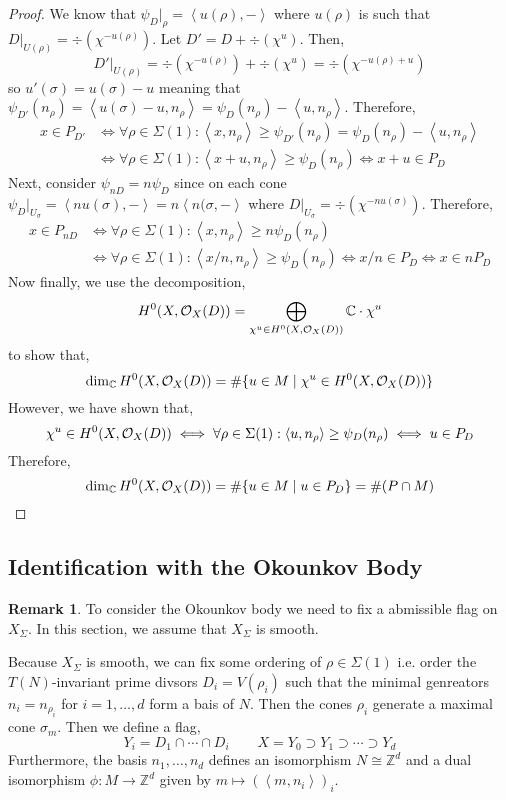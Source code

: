 \documentclass[12pt]{extarticle}
\newcommand{\Z}{\mathbb{Z}}
\newcommand{\C}{\mathbb{C}}
\theoremstyle{definition}
\newtheorem{remark}{Remark}
\newenvironment{definition}[1][Definition:]{\begin{trivlist}
\item[\hskip \labelsep {\bfseries #1}]}{\end{trivlist}}
\newcommand{\inner}[2]{\left< #1, #2 \right>}
\begin{document}
\begin{proof}
We know that $\psi_D |_\rho = \inner{u(\rho)}{-}$ where $u(\rho)$ is such that $D |_{U(\rho)} = \div{(\chi^{-u(\rho)})}$. Let $D' = D + \div{(\chi^u)}$. Then,
\[ D' |_{U(\rho)} = \div{(\chi^{-u(\rho)})} + \div{(\chi^u)} = \div{(\chi^{-u(\rho) + u})} \]
so $u'(\sigma) = u(\sigma) - u$ meaning that $\psi_{D'}(n_\rho) = \inner{u(\sigma) - u}{n_\rho} = \psi_D(n_\rho) - \inner{u}{n_\rho}$. Therefore,
\begin{align*}
x \in P_{D'} & \iff \forall \rho \in \Sigma(1) : \inner{x}{n_\rho} \ge \psi_{D'}(n_\rho) = \psi_D(n_\rho) - \inner{u}{n_\rho}
\\
& \iff \forall \rho \in \Sigma(1) : \inner{x + u}{n_\rho} \ge \psi_D(n_\rho) \iff x + u \in P_D 
\end{align*}
Next, consider $\psi_{nD} = n \psi_D$ since on each cone $\psi_D |_{U_\sigma} = \inner{nu(\sigma)}{-} = n \inner{n(\sigma}{-}$ where $D |_{U_\sigma} = \div{(\chi^{-n u(\sigma)})}$. Therefore,
\begin{align*}
x \in P_{nD} & \iff \forall \rho \in \Sigma(1) : \inner{x}{n_\rho} \ge n \psi_{D}(n_\rho)
\\
& \iff \forall \rho \in \Sigma(1) : \inner{x/n}{n_\rho} \ge \psi_D(n_\rho) \iff x/n \in P_D \iff x \in n P_D 
\end{align*}
Now finally, we use the decomposition,
\[ H^0(X, \struct{X}(D)) = \bigoplus_{\chi^u \in H^0(X, \struct{X}(D))} \C \cdot \chi^u \]
to show that,
\[ \dim_{\C} H^0(X, \struct{X}(D)) = \# \{ u \in M \mid \chi^u \in H^0(X, \struct{X}(D)) \} \]
However, we have shown that,
\[ \chi^u \in H^0(X, \struct{X}(D)) \iff \forall \rho \in \Sigma(1) : \inner{u}{n_\rho} \ge \psi_D(n_\rho) \iff u \in P_D \]
Therefore,
\[ \dim_{\C} H^0(X, \struct{X}(D)) = \# \{ u \in M \mid u \in P_D \} = \# (P \cap M) \]
\end{proof}


\subsection{Identification with the Okounkov Body}

\begin{remark}
To consider the Okounkov body we need to fix a abmissible flag on $X_\Sigma$. In this section, we assume that $X_\Sigma$ is smooth. 
\end{remark}

\begin{definition}
Because $X_\Sigma$ is smooth, we can fix some ordering of $\rho \in \Sigma(1)$ i.e. order the $T(N)$-invariant prime divsors $D_i = V(\rho_i)$ such that the minimal genreators $n_i = n_{\rho_i}$ for $i = 1, \dots, d$ form a bais of $N$. Then the cones $\rho_i$ generate a maximal cone $\sigma_m$. Then we define a flag,
\[ Y_i = D_1 \cap \cdots \cap D_i \quad \quad X = Y_0 \supset Y_1 \supset \cdots \supset Y_d \]
Furthermore, the basis $n_1, \dots, n_d$ defines an isomorphism $N \cong \Z^d$ and a dual isomorphism $\phi : M \to \Z^d$ given by $m \mapsto (\inner{m}{n_i})_{i}$. 
\end{definition}
\end{document}
